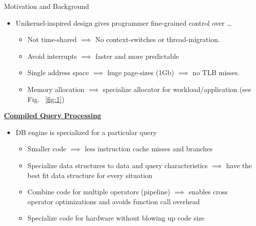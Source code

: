 \begin{block}{Motivation and Background}
\begin{itemize}
    \item {Unikernel-inspired design gives programmer fine-grained control over \ldots}
      \begin{itemize}
      \item Not time-shared $\implies$ No context-switches or thread-migration.
      \item Avoid interrupts $\implies$ faster and more predictable
      \item Single address space $\implies$ huge page-sizes (1Gb) $\implies$ no TLB misses.
      \item Memory allocation $\implies$ specialize allocator for workload/application (see Fig.~ \ref{fig:1})
      \end{itemize}
    \end{itemize}
  
    \underline{\textbf{Compiled Query Processing}}
    \begin{itemize}
    \item DB engine is specialized for a particular query
      \begin{itemize}
      \item Smaller code $\implies$ less instruction cache misses and branches
      \item Specialize data structures to data and query characteristics $\implies$ have the best fit data structure for every situation
      \item Combine code for multiple operators (pipeline) $\implies$ enables cross operator optimizations and avoids function call overhead
      \item Specialize code for hardware without blowing up code size
      \end{itemize}
    \end{itemize}
\end{block}


